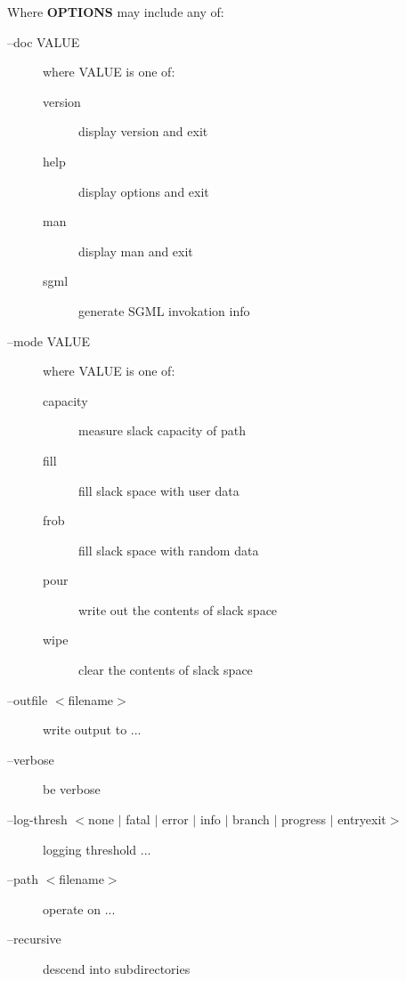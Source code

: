 \documentclass[letterpaper]{article}
\begin{document}
Where {\bfseries OPTIONS} may include any of:
\begin{description}
\item[--doc VALUE] \mbox{}

where VALUE is one of:
\begin{description}
\item[version] \mbox{}

display version and exit

\item[help] \mbox{}

display options and exit

\item[man] \mbox{}

display man and exit

\item[sgml] \mbox{}

generate SGML invokation info

\end{description}


\item[--mode VALUE] \mbox{}

where VALUE is one of:
\begin{description}
\item[capacity] \mbox{}

measure slack capacity of path

\item[fill] \mbox{}

fill slack space with user data

\item[frob] \mbox{}

fill slack space with random data

\item[pour] \mbox{}

write out the contents of slack space

\item[wipe] \mbox{}

clear the contents of slack space

\end{description}


\item[--outfile $<$filename$>$] \mbox{}

write output to ...

\item[--verbose] \mbox{}

be verbose

\item[--log-thresh $<$none $|$ fatal $|$ error $|$ info $|$ branch $|$ progress $|$ entryexit$>$] \mbox{}

logging threshold ...

\item[--path $<$filename$>$] \mbox{}

operate on ...

\item[--recursive] \mbox{}

descend into subdirectories

\end{description}
\end{document}
